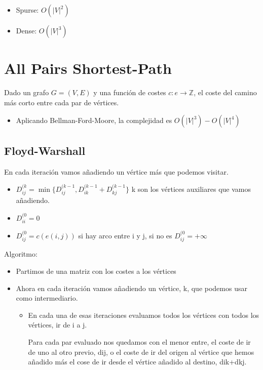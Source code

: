 \documentclass[12pt, twoside, openright]{report} %
\begin{document}
\begin{itemize}

\item Spurse: \(O(|V|^2)\)
\item Dense: \(O(|V|^3)\)
\end{itemize}


\section{All Pairs Shortest-Path}

Dado un grafo \(G=(V,E)\) y una función de costes \(c: e → \mathbb{Z}\),
el coste del camino más corto entre cada par de vértices.

\begin{itemize}
\item Aplicando Bellman-Ford-Moore, la complejidad es \(O(|V|^3)-O(|V|^4)\)
\end{itemize}

\subsection{Floyd-Warshall}

En cada iteración vamos añadiendo un vértice más que podemos visitar.

\begin{itemize}
	\item $D_{ij}^{(k} = \min \{ D_{ij}^{(k-1}, D_{ik}^{(k-1}+D_{kj}^{(k-1} \}$ k son los vértices auxiliares que vamos añadiendo.
	\item $D_{ii}^{(0} =0$
	\item $D_{ij}^{(0}= c(e(i,j))$ si hay arco entre i y j, si no es $D_{ij}^{(0}= + \infty$
\end{itemize}
     

Algoritmo: 
\begin{itemize}
	\item Partimos de una matriz con los costes a los vértices
	\item Ahora en cada
	iteración vamos añadiendo un vértice, k, que podemos usar como
	intermediario.
	\begin{itemize}
		\item En cada una de esas iteraciones evaluamos todos los
		vértices con todos los vértices, ir de i a j.
		
		Para cada par evaluado
		nos quedamos con el menor entre, el coste de ir de uno al otro previo,
		dij, o el coste de ir del origen al vértice que hemos añadido más el
		cose de ir desde el vértice añadido al destino, dik+dkj.
	\end{itemize}
	
\end{itemize}
\end{document}
